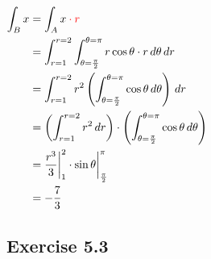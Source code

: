 $\begin{aligned}[t]
    \int_B x
     & = \int_A x \color{red} \cdot r                                                                             \\
     & = \int_{r=1}^{r=2} \int_{\theta=\frac{\pi}{2}}^{\theta=\pi} r \cos{\theta} \cdot r \,d\theta \,dr          \\
     & = \int_{r=1}^{r=2} r^2 \left( \int_{\theta=\frac{\pi}{2}}^{\theta=\pi} \cos{\theta} \,d\theta \right) \,dr \\
     & = \left( \int_{r=1}^{r=2} r^2 \,dr \right) \cdot\left( \int_{\theta=\frac{\pi}{2}}^{\theta=\pi} \cos{\theta} \,d\theta \right) \\
     & = \frac{r^3}{3} \bigg|_1^2 \cdot \sin{\theta} \bigg|_{\frac{\pi}{2}}^\pi                                   \\
     & = -\frac{7}{3}
\end{aligned}$

\subsection*{Exercise 5.3}

